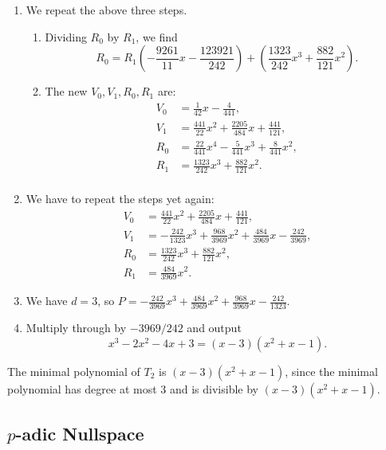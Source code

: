 \begin{example}
\begin{enumerate}
\item We repeat the above three steps.
\begin{enumerate}
\item Dividing $R_0$ by $R_1$, we find
$$
  R_0 = R_1 \left(-\frac{9261}{11}x - \frac{123921}{242}\right) + 
    \left( \frac{1323}{242}x^3 + \frac{882}{121}x^2\right).
$$
\item The new $V_0, V_1, R_0, R_1$ are:
\begin{align*}
  V_0 &= \frac{1}{42}x - \frac{4}{441},\\
  V_1 &= \frac{441}{22}x^{2} + \frac{2205}{484}x + \frac{441}{121},\\
  R_0 &= \frac{22}{441}x^{4} - \frac{5}{441}x^{3} + \frac{8}{441}x^{2},\\
  R_1 &= \frac{1323}{242}x^{3} + \frac{882}{121}x^{2}.\\
\end{align*}
\end{enumerate}

\item We have to repeat the steps yet again:
\begin{align*}
 V_0 &= \frac{441}{22}x^{2} + \frac{2205}{484}x + \frac{441}{121},\\
 V_1 &= -\frac{242}{1323}x^{3} + \frac{968}{3969}x^{2} + 
             \frac{484}{3969}x - \frac{242}{3969},\\
 R_0 &= \frac{1323}{242}x^{3} + \frac{882}{121}x^{2},\\
 R_1 &= \frac{484}{3969}x^{2}.
\end{align*}

\item We have $d=3$, 
 so $P = -\frac{242}{3969}x^{3} + \frac{484}{3969}x^{2} + \frac{968}{3969}x - \frac{242}{1323}$.
\item Multiply through by $-3969/242$ and
output $$x^3 - 2x^2 - 4x + 3 = (x - 3)(x^2 + x - 1).$$
\end{enumerate}
The minimal polynomial of $T_2$ is $(x - 3)(x^2 + x - 1)$,
since the minimal polynomial has degree at most $3$
and is divisible by $(x - 3)(x^2 + x - 1)$.
\end{example}


\subsection{$p$-adic Nullspace}
 
